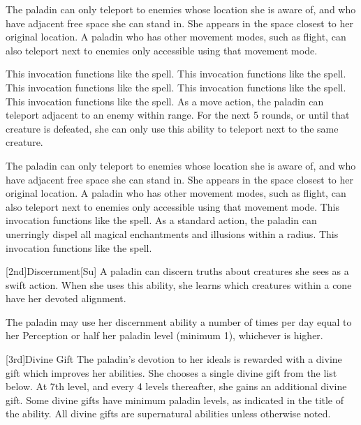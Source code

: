 The paladin can only teleport to enemies whose location she is aware of, and who have adjacent free space she can stand in.
She appears in the space closest to her original location.
A paladin who has other movement modes, such as flight, can also teleport next to enemies only accessible using that movement mode.

 This invocation functions like the 
spell.
 This invocation functions like the 
spell.
 This invocation functions like the 
spell.
 This invocation functions like the 
spell.
 This invocation functions like the 
spell.
As a move action, the paladin can teleport adjacent to an enemy within \rngmed range.
For the next 5 rounds, or until that creature is defeated, she can only use this ability to teleport next to the same creature.

The paladin can only teleport to enemies whose location she is aware of, and who have adjacent free space she can stand in.
She appears in the space closest to her original location.
A paladin who has other movement modes, such as flight, can also teleport next to enemies only accessible using that movement mode.
 This invocation functions like the 
spell.
As a standard action, the paladin can unerringly dispel all magical enchantments and illusions within a \arealarge radius.
 This invocation functions like the 
spell.



[2nd]{Discernment}[Su]
A paladin can discern truths about creatures she sees as a swift action.
When she uses this ability, she learns which creatures within a \arealarge cone have her devoted alignment.

The paladin may use her discernment ability a number of times per day equal to her Perception or half her paladin level (minimum 1), whichever is higher.

[3rd]{Divine Gift}
The paladin's devotion to her ideals is rewarded with a divine gift which improves her abilities.
She chooses a single divine gift from the list below.
At 7th level, and every 4 levels thereafter, she gains an additional divine gift.
Some divine gifts have minimum paladin levels, as indicated in the title of the ability.
All divine gifts are supernatural abilities unless otherwise noted.

